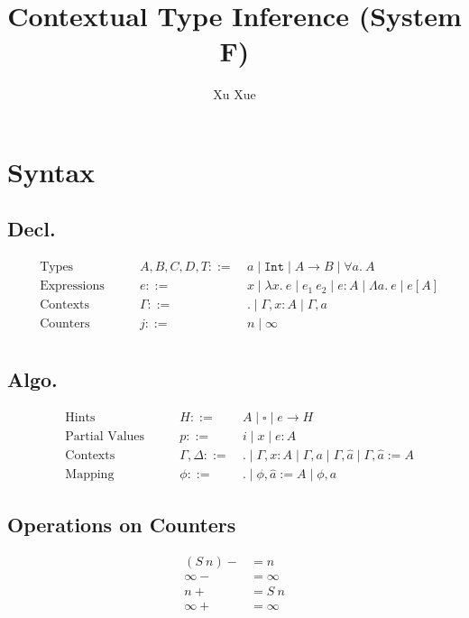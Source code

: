 \documentclass{article}
\title{Contextual Type Inference (System F)}
\author{Xu Xue}
\begin{document}
\maketitle

\section{Syntax}

\subsection{Decl.}

\begin{align*}
&\text{Types} \quad\quad &A, B, C, D, T ::=&~ a \mid \mathtt{Int} \mid A \rightarrow B \mid \forall a.~A\\
&\text{Expressions} \quad \quad &e::=&~ x \mid \lambda x . ~e \mid e_1~e_2 \mid e : A \mid \Lambda a.~e \mid e[A]\\
&\text{Contexts} \quad\quad &\Gamma::=&~ . \mid \Gamma, x : A \mid \Gamma, a\\
&\text{Counters} \quad\quad &j ::=&~ n \mid \infty\\
\end{align*}

\subsection{Algo.}

\begin{align*}
    &\text{Hints} \quad\quad &H ::=&~ A \mid \square \mid \boxed{e} \rightarrow H\\
    &\text{Partial Values} \quad \quad &p::=&~ i \mid x \mid e : A\\
    &\text{Contexts} \quad\quad &\Gamma,\Delta::=&~ . \mid \Gamma, x : A \mid \Gamma, a \mid \Gamma, \hat{a} \mid \Gamma, \hat{a}:=A\\
    &\text{Mapping}\quad\quad &\phi ::=&~. \mid \phi, \hat{a}:=A \mid \phi, a
\end{align*}

\subsection{Operations on Counters}

\begin{align*}
    (S~n)- &= n \\
    \infty - &= \infty \\
    n+ &= S~n \\
    \infty + &= \infty
\end{align*}
\end{document}
